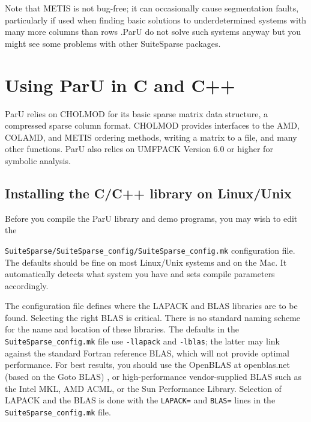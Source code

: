 \documentclass[12pt]{article}
\begin{document}
Note that METIS is not bug-free; it can occasionally cause segmentation 
faults, particularly if used when finding basic solutions to underdetermined 
systems with many more columns than rows .ParU do not solve such 
systems anyway but you might see some problems with other SuiteSparse packages.

\section{Using ParU in C and C++}

ParU relies on CHOLMOD for its basic sparse matrix data structure, a compressed 
sparse column format.  CHOLMOD provides interfaces to the AMD, COLAMD, and METIS
ordering methods, writing a matrix to a file, and many other
functions. ParU also relies on UMFPACK Version 6.0 or higher for symbolic 
analysis. 


\subsection{Installing the C/C++ library on Linux/Unix}

Before you compile the ParU library and demo programs, you may wish to
edit the 

\verb'SuiteSparse/SuiteSparse_config/SuiteSparse_config.mk' 
configuration file.  The defaults should be fine on most Linux/Unix systems and 
on the Mac.
It automatically detects what system you have and sets compile parameters
accordingly.

The configuration file defines where the LAPACK and BLAS libraries are to be
found.  Selecting the right BLAS is critical.  There is no standard naming
scheme for the name and location of these libraries.  The defaults in the
\verb'SuiteSparse_config.mk' file use \verb'-llapack' and \verb'-lblas';
the latter may link against the standard Fortran reference BLAS, which will not 
provide optimal performance.  For best results, you should use the OpenBLAS
at openblas.net
(based on the Goto BLAS)
\cite{GotoVanDeGeijn08}, or high-performance vendor-supplied BLAS such as the
Intel MKL, AMD ACML, or the Sun Performance Library.  Selection of LAPACK and
the BLAS is done with the \verb'LAPACK=' and \verb'BLAS=' lines in the
\verb'SuiteSparse_config.mk' file.
\end{document}
